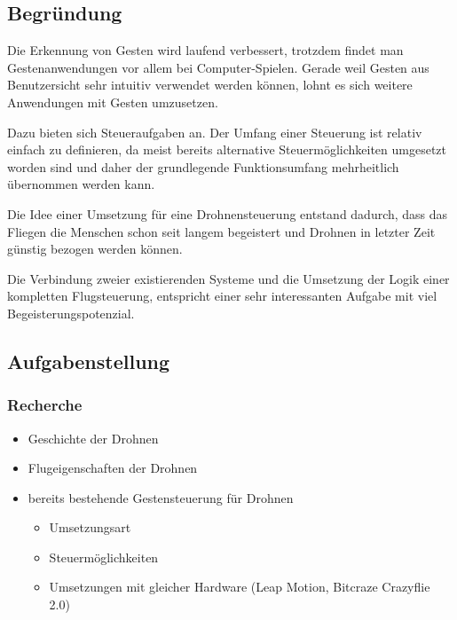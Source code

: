 \subsection{Begründung}
Die Erkennung von Gesten wird laufend verbessert, trotzdem findet man Gestenanwendungen vor allem bei Computer-Spielen.
Gerade weil Gesten aus Benutzersicht sehr intuitiv verwendet werden können, lohnt es sich weitere Anwendungen mit Gesten umzusetzen.

Dazu bieten sich Steueraufgaben an.
Der Umfang einer Steuerung ist relativ einfach zu definieren, da meist bereits alternative Steuermöglichkeiten umgesetzt worden sind und daher der grundlegende Funktionsumfang mehrheitlich übernommen werden kann.

Die Idee einer Umsetzung für eine Drohnensteuerung entstand dadurch, dass das Fliegen die Menschen schon seit langem begeistert und Drohnen in letzter Zeit günstig bezogen werden können.

Die Verbindung zweier existierenden Systeme und die Umsetzung der Logik einer kompletten Flugsteuerung, entspricht einer sehr interessanten Aufgabe mit viel Begeisterungspotenzial.


\subsection{Aufgabenstellung}
\subsubsection{Recherche}
\begin{itemize}
	\item Geschichte der Drohnen
	\item Flugeigenschaften der Drohnen
	\item bereits bestehende Gestensteuerung für Drohnen
	\begin{itemize}
		\item Umsetzungsart
		\item Steuermöglichkeiten
		\item Umsetzungen mit gleicher Hardware (Leap Motion, Bitcraze Crazyflie 2.0)
	\end{itemize}
\end{itemize}


